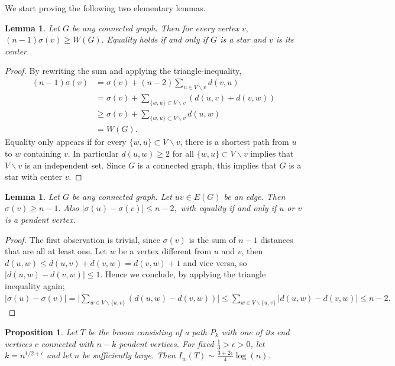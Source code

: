 \documentclass{article}
\newtheorem{lem}[defi]{Lemma}
\newtheorem{prop}[defi]{Proposition}
\newcommand*{\abs}[1]{\lvert #1\rvert}
\begin{document}
{We start proving the following two elementary lemmas.
\begin{lem}\label{lem:sigmavsW}
    Let $G$ be any connected graph. Then for every vertex $v,$ $(n-1)\sigma(v) \ge W(G).$
    Equality holds if and only if $G$ is a star and $v$ is its center. 
\end{lem}

\begin{proof}
    By rewriting the sum and applying the triangle-inequality,
    \begin{align*}
        (n-1)\sigma(v) &=\sigma(v)+(n-2)\sum_{u \in V \backslash v} d(v,u)\\
        &=\sigma(v)+\sum_{ \{w, u\} \subset V \backslash v} \left(d(u,v)+d(v,w)\right)\\
        &\ge \sigma(v)+\sum_{\{w, u\} \subset V \backslash v} d(u,w)\\
        &=W(G).
    \end{align*}
    Equality only appears if for every $\{w, u\} \subset V \backslash v$, there is a shortest path from $u$ to $w$ containing $v$. In particular $d(u,w) \ge 2$ for all $\{w, u\} \subset V \backslash v$ implies that $V\backslash v$ is an independent set. Since $G$ is a connected graph, this implies that $G$ is a star with center $v$.
\end{proof}

\begin{lem}\label{lem:diffsigma}
    Let $G$ be any connected graph. 
    Let $uv \in E(G)$ be an edge.
    Then $\sigma(v) \ge n-1.$
    Also $\abs{\sigma(u)-\sigma(v)} \le n-2, $ with equality if and only if $u$ or $v$ is a pendent vertex.
\end{lem}

\begin{proof}
    The first observation is trivial, since $\sigma(v)$ is the sum of $n-1$ distances that are all at least one.
    Let $w$ be a vertex different from $u$ and $v$, then $d(u,w)\le d(u,v)+d(v,w)=d(v,w)+1$ and vice versa, so $\abs{d(u,w)-d(v,w)} \le 1.$
    Hence we conclude, by applying the triangle inequality again; $\abs{\sigma(u)-\sigma(v)}=\abs{\sum_{w \in V \backslash \{u,v\} } \left(d(u,w)-d(v,w)\right) } \le \sum_{w\in V\backslash\{u,v\}} |d(u,w)-d(v,w)|
    \le n-2. $
\end{proof}

\begin{prop}\label{prop:Iwbroom}
    Let $T$ be the broom consisting of a path $P_k$ with one of its end vertices $c$ connected with $n-k$ pendent vertices.
For fixed $\frac{1}{3}> \epsilon>0$, let $k=n^{1/2+\epsilon}$ and let $n$ be sufficiently large.
Then $I_w(T) \sim \frac{3+2\epsilon}{4} \log(n).$
\end{prop}



}
\end{document}
